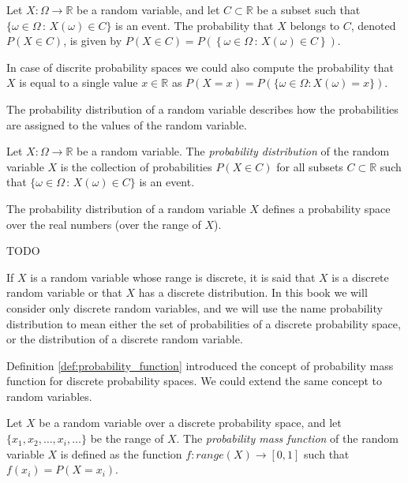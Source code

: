 \begin{definition}
Let $X : \Omega \rightarrow \mathbb{R}$ be a random variable, and let $C \subset \mathbb{R}$ be a subset such that $\{ \omega \in \Omega \,:\, X \left( \omega \right) \in C\}$ is an event. The probability that $X$ belongs to $C$, denoted $P\left(X \in C \right)$, is given by $P\left( X \in C \right)=P \left( \left\{ \omega \in \Omega \,:\, X \left( \omega \right) \in C\right\} \right)$.
\end{definition}

In case of discrite probability spaces we could also compute the probability that $X$ is equal to a single value $x \in \mathbb{R}$ as $P(X = x) = P(\{ \omega \in \Omega : X(\omega) = x\})$.

The probability distribution of a random variable describes how the probabilities are assigned to the values of the random variable. 

\begin{definition}
Let $X : \Omega \rightarrow \mathbb{R}$ be a random variable. The \emph{probability distribution} of the random variable $X$ is the collection of probabilities $P\left( X \in C \right)$ for all subsets $C \subset \mathbb{R}$ such that $\{ \omega \in \Omega \,:\, X \left( \omega \right) \in C\}$ is an event.
\end{definition}

The probability distribution of a random variable $X$ defines a probability space over the real numbers (over the range of $X$). 

\begin{example}
{\color{red} TODO }
\end{example}

If $X$ is a random variable whose range is discrete, it is said that $X$ is a discrete random variable or that $X$ has a discrete distribution. In this book we will consider only discrete random variables, and we will use the name probability distribution to mean either the set of probabilities of a discrete probability space, or the distribution of a discrete random variable.

Definition \ref{def:probability_function} introduced the concept of probability mass function for discrete probability spaces. We could extend the same concept to random variables.

\begin{definition}
Let $X$ be a random variable over a discrete probability space, and let $\{ x_1, x_2, \ldots, x_i, \ldots \}$ be the range of $X$. The \emph{probability mass function} of the random variable $X$ is defined as the function $f : range \left( X \right) \rightarrow [0, 1]$ such that $f \left( x_i \right) = P \left( X = x_i \right)$.
\end{definition}

